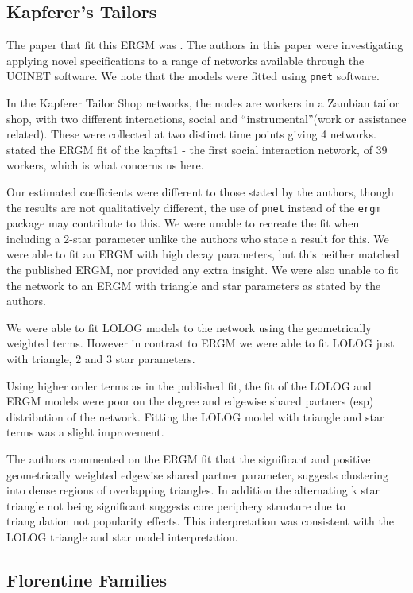 \documentclass[
]{statsoc}
\begin{document}
\subsection{Kapferer's Tailors}

The paper that fit this ERGM was \cite{Robins2007}. The authors in this
paper were investigating applying novel specifications to a range of
networks available through the UCINET software. We note that the models
were fitted using \texttt{pnet} software.

In the Kapferer Tailor Shop networks, the nodes are workers in a Zambian
tailor shop, with two different interactions, social and
``instrumental''(work or assistance related). These were collected at
two distinct time points giving 4 networks. \cite{Robins2007} stated the
ERGM fit of the kapfts1 - the first social interaction network, of 39
workers, which is what concerns us here.

Our estimated coefficients were different to those stated by the
authors, though the results are not qualitatively different, the use of
\texttt{pnet} instead of the \texttt{ergm} package may contribute to
this. We were unable to recreate the fit when including a 2-star
parameter unlike the authors who state a result for this. We were able
to fit an ERGM with high decay parameters, but this neither matched the
published ERGM, nor provided any extra insight. We were also unable to
fit the network to an ERGM with triangle and star parameters as stated
by the authors.

We were able to fit LOLOG models to the network using the geometrically
weighted terms. However in contrast to ERGM we were able to fit LOLOG
just with triangle, 2 and 3 star parameters.

Using higher order terms as in the published fit, the fit of the LOLOG
and ERGM models were poor on the degree and edgewise shared partners
(esp) distribution of the network. Fitting the LOLOG model with triangle
and star terms was a slight improvement.

The authors commented on the ERGM fit that the significant and positive
geometrically weighted edgewise shared partner parameter, suggests
clustering into dense regions of overlapping triangles. In addition the
alternating k star triangle not being significant suggests core
periphery structure due to triangulation not popularity effects. This
interpretation was consistent with the LOLOG triangle and star model
interpretation.

\subsection{Florentine Families}
\end{document}

